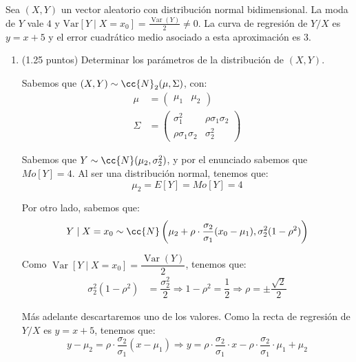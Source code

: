 \documentclass[12pt]{article}
\DeclareMathOperator{\Var}{Var}
\begin{document}
    \begin{ejercicio}[2 puntos]
        Sea $(X, Y)$ un vector aleatorio con distribución normal bidimensional. La moda de $Y$ vale $4$ y $\mathrm{Var}[Y \mid X=x_0] = \frac{\Var(Y)}{2} \neq 0$. La curva de regresión de $Y/X$ es $y = x + 5$ y el error cuadrático medio asociado a esta aproximación es $3$.
        \begin{enumerate}
            \item (1.25 puntos) Determinar los parámetros de la distribución de $(X, Y)$.
            
            Sabemos que $(X,Y)\sim \cc{N}_2(\mu,\Sigma)$, con:
            \begin{align*}
                \mu &= \begin{pmatrix}
                    \mu_1 & \mu_2
                \end{pmatrix}\\
                \Sigma &= \begin{pmatrix}
                    \sigma_1^2 & \rho\sigma_1\sigma_2\\
                    \rho\sigma_1\sigma_2 & \sigma_2^2
                \end{pmatrix}
            \end{align*}

            Sabemos que $Y\sim \cc{N}(\mu_2,\sigma_2^2)$, y por el enunciado sabemos que $Mo[Y]=4$. Al ser una distribución normal, tenemos que:
            \begin{equation*}
                \mu_2 = E[Y] = Mo[Y]=4
            \end{equation*}

            Por otro lado, sabemos que:
            \begin{equation*}
                Y\mid X=x_0\sim \cc{N}\left(\mu_2+\rho\cdot \frac{\sigma_2}{\sigma_1}(x_0-\mu_1),\sigma_2^2(1-\rho^2)\right)
            \end{equation*}

            Como $\Var[Y\mid X=x_0]=\dfrac{\Var(Y)}{2}$, tenemos que:
            \begin{align*}
                \sigma_2^2(1-\rho^2) &= \dfrac{\sigma_2^2}{2}
                \Longrightarrow
                1-\rho^2 = \dfrac{1}{2}
                \Longrightarrow
                \rho = \pm \dfrac{\sqrt{2}}{2}
            \end{align*}

            Más adelante descartaremos uno de los valores. Como la recta de regresión de $Y/X$ es $y=x+5$, tenemos que:
            \begin{equation*}
                y-\mu_2 = \rho\cdot \dfrac{\sigma_2}{\sigma_1}(x-\mu_1)
                \Longrightarrow
                y = \rho\cdot \dfrac{\sigma_2}{\sigma_1}\cdot x -\rho\cdot \dfrac{\sigma_2}{\sigma_1}\cdot\mu_1 + \mu_2
            \end{equation*}


\end{enumerate}
\end{ejercicio}
\end{document}
